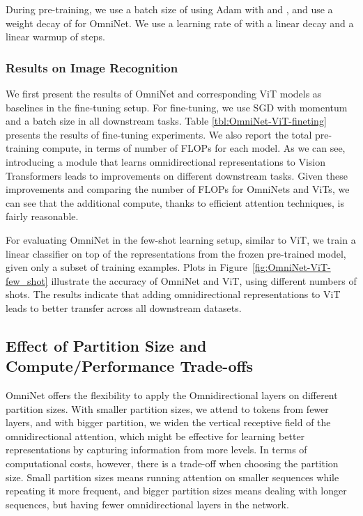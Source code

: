 \documentclass{article}
\begin{document}
During pre-training, we use a batch size of  using Adam with  and , and use a weight decay of  for OmniNet. We use a learning rate of  with a linear decay and a linear warmup of  steps.


\subsubsection{Results on Image Recognition}
We first present the results of OmniNet and corresponding ViT models as baselines in the fine-tuning setup. For fine-tuning, we use SGD with momentum and a batch size  in all downstream tasks. 
Table \ref{tbl:OmniNet-ViT-fineting} presents the results of fine-tuning experiments. We also report the total pre-training compute, in terms of number of FLOPs for each model. As we can see, introducing a module that learns omnidirectional representations to Vision Transformers leads to improvements on different downstream tasks. Given these improvements and comparing the number of FLOPs for OmniNets and ViTs, we can see that the additional compute, thanks to efficient attention techniques, is fairly reasonable.

For evaluating OmniNet in the few-shot learning setup, similar to ViT, we train a linear classifier on top of the representations from the frozen pre-trained model, given only a subset of training examples. Plots in Figure~\ref{fig:OmniNet-ViT-few_shot} illustrate the accuracy of OmniNet and ViT, using different numbers of shots. The results indicate that adding omnidirectional representations to ViT leads to better transfer across all downstream datasets.  


\subsection{Effect of Partition Size and Compute/Performance Trade-offs}
OmniNet offers the flexibility to apply the Omnidirectional layers on different partition sizes. With smaller partition sizes, we attend to tokens from fewer layers, and with bigger partition, we widen the vertical receptive field of the omnidirectional attention, which might be effective for learning better representations by capturing information from more levels. In terms of computational costs, however, there is a trade-off when choosing the partition size. Small partition sizes means running attention on smaller sequences while repeating it more frequent, and bigger partition sizes means dealing with longer sequences, but having fewer omnidirectional layers in the network. 
\end{document}

